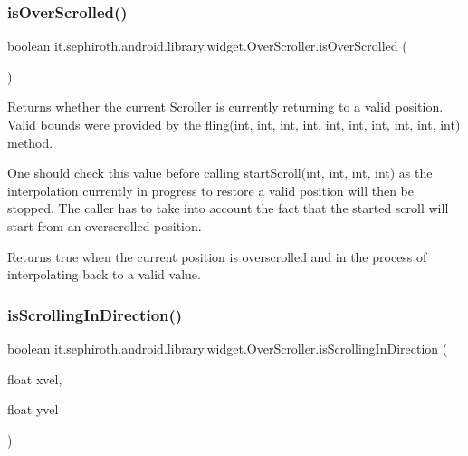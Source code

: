 \subsubsection{\texorpdfstring{is\+Over\+Scrolled()}{isOverScrolled()}}
{\footnotesize\ttfamily boolean it.\+sephiroth.\+android.\+library.\+widget.\+Over\+Scroller.\+is\+Over\+Scrolled (\begin{DoxyParamCaption}{ }\end{DoxyParamCaption})}

Returns whether the current Scroller is currently returning to a valid position. Valid bounds were provided by the \hyperlink{classit_1_1sephiroth_1_1android_1_1library_1_1widget_1_1_over_scroller_ad9fb62c5f9c44a97e096cdfc6240825a}{fling(int, int, int, int, int, int, int, int, int, int)} method.

One should check this value before calling \hyperlink{classit_1_1sephiroth_1_1android_1_1library_1_1widget_1_1_over_scroller_a8640289a2ddc3d48497882c497850798}{start\+Scroll(int, int, int, int)} as the interpolation currently in progress to restore a valid position will then be stopped. The caller has to take into account the fact that the started scroll will start from an overscrolled position.

\begin{DoxyReturn}{Returns}
true when the current position is overscrolled and in the process of interpolating back to a valid value. 
\end{DoxyReturn}
\mbox{\label{classit_1_1sephiroth_1_1android_1_1library_1_1widget_1_1_over_scroller_a3e809e8269caa1cd9d8e674a51840f00}} 
\subsubsection{\texorpdfstring{is\+Scrolling\+In\+Direction()}{isScrollingInDirection()}}
{\footnotesize\ttfamily boolean it.\+sephiroth.\+android.\+library.\+widget.\+Over\+Scroller.\+is\+Scrolling\+In\+Direction (\begin{DoxyParamCaption}\item[{float}]{xvel,  }\item[{float}]{yvel }\end{DoxyParamCaption})}

